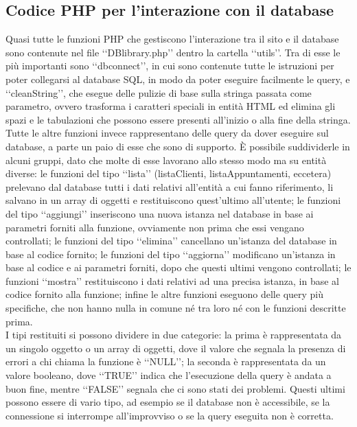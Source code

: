 {	\subsection{Codice PHP per l'interazione con il database}{
	\label{sec:PHPDB}
		Quasi tutte le funzioni PHP che gestiscono l'interazione tra il sito e il database sono contenute nel file ‘‘DBlibrary.php’’ dentro la cartella ‘‘utils’’. Tra di esse le più importanti sono ‘‘dbconnect’’, in cui sono contenute tutte le istruzioni per poter collegarsi al database SQL, in modo da poter eseguire facilmente le query, e ‘‘cleanString’’, che esegue delle pulizie di base sulla stringa passata come parametro, ovvero trasforma i caratteri speciali in entità HTML ed elimina gli spazi e le tabulazioni che possono essere presenti all'inizio o alla fine della stringa.\\
		Tutte le altre funzioni invece rappresentano delle query da dover eseguire sul database, a parte un paio di esse che sono di supporto. È possibile suddividerle in alcuni gruppi, dato che molte di esse lavorano allo stesso modo ma su entità diverse: le funzioni del tipo ‘‘lista’’ (listaClienti, listaAppuntamenti, eccetera) prelevano dal database tutti i dati relativi all'entità a cui fanno riferimento, li salvano in un array di oggetti e restituiscono quest'ultimo all'utente; le funzioni del tipo ‘‘aggiungi’’ inseriscono una nuova istanza nel database in base ai parametri forniti alla funzione, ovviamente non prima che essi vengano controllati; le funzioni del tipo ‘‘elimina’’ cancellano un'istanza del database in base al codice fornito; le funzioni del tipo ‘‘aggiorna’’ modificano un'istanza in base al codice e ai parametri forniti, dopo che questi ultimi vengono controllati; le funzioni ‘‘mostra’’ restituiscono i dati relativi ad una precisa istanza, in base al codice fornito alla funzione; infine le altre funzioni eseguono delle query più specifiche, che non hanno nulla in comune né tra loro né con le funzioni descritte prima.\\
		I tipi restituiti si possono dividere in due categorie: la prima è rappresentata da un singolo oggetto o un array di oggetti, dove il valore che segnala la presenza di errori a chi chiama la funzione è ‘‘NULL’’; la seconda è rappresentata da un valore booleano, dove ‘‘TRUE’’ indica che l'esecuzione della query è andata a buon fine, mentre ‘‘FALSE’’ segnala che ci sono stati dei problemi. Questi ultimi possono essere di vario tipo, ad esempio se il database non è accessibile, se la connessione si interrompe all'improvviso o se la query eseguita non è corretta.
}}
